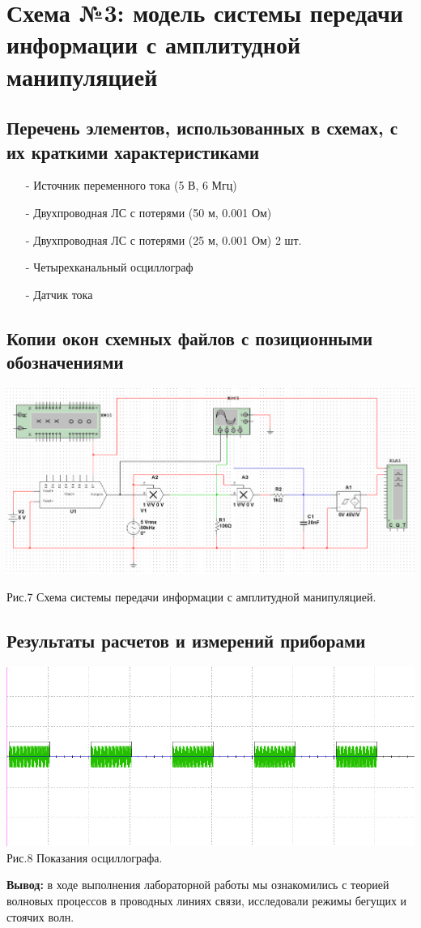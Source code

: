 \documentclass[11pt]{article}
\begin{document}
\section{ Схема №3: модель системы передачи информации с амплитудной манипуляцией}
\subsection{Перечень элементов, использованных в схемах, с
их краткими характеристиками}
\begin{itemize}    
    \item[-] Источник переменного тока (5 В, 6 Мгц)
    \item[-] Двухпроводная ЛС с потерями (50 м, 0.001 Ом)
    \item[-] Двухпроводная ЛС с потерями (25 м, 0.001 Ом) 2 шт.
    \item[-] Четырехканальный осциллограф
    \item[-] Датчик тока
\end{itemize}

\subsection{Копии окон схемных файлов с позиционными обозначениями}
\includegraphics[width=1\linewidth]{img/third.png}
\begin{center}
    Рис.7 Схема системы передачи информации с амплитудной манипуляцией.
\end{center}

\subsection{Результаты расчетов и измерений приборами}
\begin{center}
    \includegraphics[width=1\linewidth]{img/third1.png}
        Рис.8 Показания осциллографа.
\end{center}


\textbf{Вывод:} в ходе выполнения лабораторной работы мы ознакомились с теорией волновых процессов в проводных линиях связи, исследовали режимы бегущих и стоячих волн.
\end{document}
